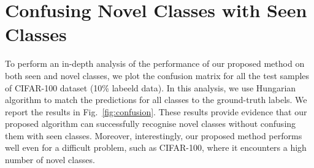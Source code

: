 \documentclass[runningheads]{eccv2022submission}
\begin{document}
\section{Confusing Novel Classes with Seen Classes}
\label{sec:conf_mat}
To perform an in-depth analysis of the performance of our proposed method on both seen and novel classes, we plot the confusion matrix for all the test samples of CIFAR-100 dataset (10\% labeeld data). In this analysis, we use Hungarian algorithm\cite{kuhn1955hungarian} to match the predictions for all classes to the ground-truth labels. We report the results in Fig.~\ref{fig:confusion}. These results provide evidence that our proposed algorithm can successfully recognise novel classes without confusing them with seen classes. Moreover, interestingly, our proposed method performs well even for a difficult problem, such as CIFAR-100, where it encounters a high number of novel classes.     

\clearpage


\end{document}
